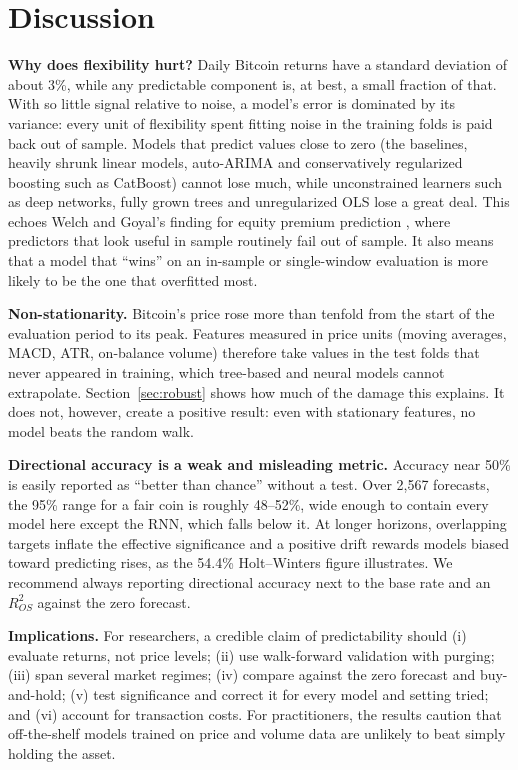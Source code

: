 \section{Discussion}
\label{sec:discussion}

\textbf{Why does flexibility hurt?} Daily Bitcoin returns have a standard deviation of about 3\%, while any predictable component is, at best, a small fraction of that. With so little signal relative to noise, a model's error is dominated by its variance: every unit of flexibility spent fitting noise in the training folds is paid back out of sample. Models that predict values close to zero (the baselines, heavily shrunk linear models, auto-ARIMA and conservatively regularized boosting such as CatBoost) cannot lose much, while unconstrained learners such as deep networks, fully grown trees and unregularized OLS lose a great deal. This echoes Welch and Goyal's finding for equity premium prediction \cite{welch2008}, where predictors that look useful in sample routinely fail out of sample. It also means that a model that ``wins'' on an in-sample or single-window evaluation is more likely to be the one that overfitted most.

\textbf{Non-stationarity.} Bitcoin's price rose more than tenfold from the start of the evaluation period to its peak. Features measured in price units (moving averages, MACD, ATR, on-balance volume) therefore take values in the test folds that never appeared in training, which tree-based and neural models cannot extrapolate. Section~\ref{sec:robust} shows how much of the damage this explains. It does not, however, create a positive result: even with stationary features, no model beats the random walk.

\textbf{Directional accuracy is a weak and misleading metric.} Accuracy near 50\% is easily reported as ``better than chance'' without a test. Over 2{,}567 forecasts, the 95\% range for a fair coin is roughly 48--52\%, wide enough to contain every model here except the RNN, which falls below it. At longer horizons, overlapping targets inflate the effective significance and a positive drift rewards models biased toward predicting rises, as the 54.4\% Holt--Winters figure illustrates. We recommend always reporting directional accuracy next to the base rate and an $R^2_{OS}$ against the zero forecast.

\textbf{Implications.} For researchers, a credible claim of predictability should (i) evaluate returns, not price levels; (ii) use walk-forward validation with purging; (iii) span several market regimes; (iv) compare against the zero forecast and buy-and-hold; (v) test significance and correct it for every model and setting tried; and (vi) account for transaction costs. For practitioners, the results caution that off-the-shelf models trained on price and volume data are unlikely to beat simply holding the asset.

